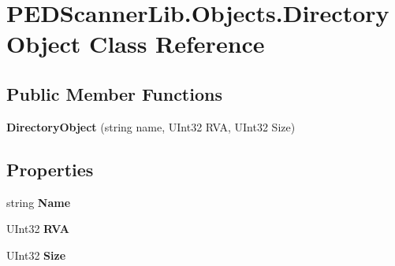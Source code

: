 \hypertarget{class_p_e_d_scanner_lib_1_1_objects_1_1_directory_object}{}\section{P\+E\+D\+Scanner\+Lib.\+Objects.\+Directory\+Object Class Reference}
\label{class_p_e_d_scanner_lib_1_1_objects_1_1_directory_object}
\subsection*{Public Member Functions}
\begin{DoxyCompactItemize}
\item 
\mbox{\label{class_p_e_d_scanner_lib_1_1_objects_1_1_directory_object_a2e78a7cf87fd2cab2acb27a16f5671f8}} 
{\bfseries Directory\+Object} (string name, U\+Int32 R\+VA, U\+Int32 Size)
\end{DoxyCompactItemize}
\subsection*{Properties}
\begin{DoxyCompactItemize}
\item 
\mbox{\label{class_p_e_d_scanner_lib_1_1_objects_1_1_directory_object_a2e270b3d714f66da57e23f32a975ef93}} 
string {\bfseries Name}
\item 
\mbox{\label{class_p_e_d_scanner_lib_1_1_objects_1_1_directory_object_ae7492459735714f502cc4efdf06eaac6}} 
U\+Int32 {\bfseries R\+VA}
\item 
\mbox{\label{class_p_e_d_scanner_lib_1_1_objects_1_1_directory_object_aab914d383a39c0a577aed7723ae2c175}} 
U\+Int32 {\bfseries Size}
\end{DoxyCompactItemize}


